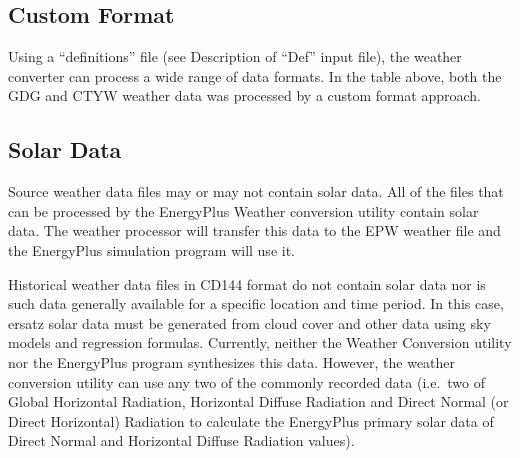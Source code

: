 \subsection{Custom Format}\label{custom-format}

Using a ``definitions'' file (see Description of ``Def'' input file), the weather converter can process a wide range of data formats. In the table above, both the GDG and CTYW weather data was processed by a custom format approach.

\subsection{Solar Data}\label{solar-data}

Source weather data files may or may not contain solar data. All of the files that can be processed by the EnergyPlus Weather conversion utility contain solar data. The weather processor will transfer this data to the EPW weather file and the EnergyPlus simulation program will use it.

Historical weather data files in CD144 format do not contain solar data nor is such data generally available for a specific location and time period. In this case, ersatz solar data must be generated from cloud cover and other data using sky models and regression formulas. Currently, neither the Weather Conversion utility nor the EnergyPlus program synthesizes this data. However, the weather conversion utility can use any two of the commonly recorded data (i.e.~two of Global Horizontal Radiation, Horizontal Diffuse Radiation and Direct Normal (or Direct Horizontal) Radiation to calculate the EnergyPlus primary solar data of Direct Normal and Horizontal Diffuse Radiation values).
